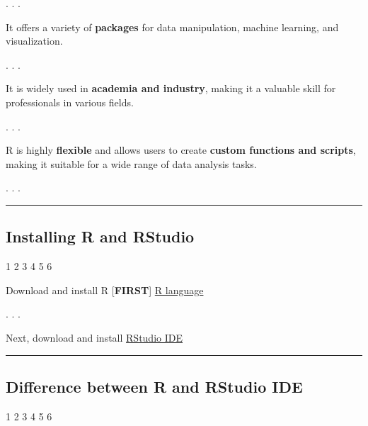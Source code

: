 \documentclass[
  letterpaper,
  DIV=11,
  numbers=noendperiod]{scrartcl}
\begin{document}
. . .

It offers a variety of {\textbf{packages}} for data manipulation,
machine learning, and visualization.

. . .

It is widely used in {\textbf{academia and industry}}, making it a
valuable skill for professionals in various fields.

. . .

R is highly {\textbf{flexible}} and allows users to create
{\textbf{custom functions and scripts}}, making it suitable for a wide
range of data analysis tasks.

. . .

\begin{center}\rule{0.5\linewidth}{0.5pt}\end{center}

\hypertarget{installing-r-and-rstudio}{%
\subsection{Installing R and RStudio}\label{installing-r-and-rstudio}}

1 {2 3 4 5 6}

Download and install R {[}\textbf{FIRST}{]}
\href{https://cloud.r-project.org/}{R language}

. . .

Next, download and install
\href{https://www.rstudio.com/products/rstudio/download/}{RStudio IDE}

\begin{center}\rule{0.5\linewidth}{0.5pt}\end{center}

\hypertarget{difference-between-r-and-rstudio-ide}{%
\subsection{Difference between R and RStudio
IDE}\label{difference-between-r-and-rstudio-ide}}

1 {2 3 4 5 6}
\end{document}
